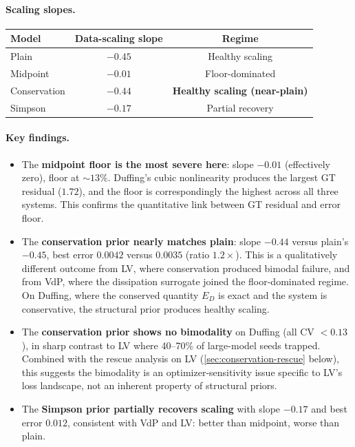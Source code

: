 \documentclass[11pt]{article}
\begin{document}
\paragraph{Scaling slopes.}

\begin{center}
\begin{tabular}{lcc}
\toprule
Model & Data-scaling slope & Regime \\
\midrule
Plain        & $-0.45$ & Healthy scaling \\
Midpoint     & $-0.01$ & Floor-dominated \\
Conservation & $-0.44$ & \textbf{Healthy scaling (near-plain)} \\
Simpson      & $-0.17$ & Partial recovery \\
\bottomrule
\end{tabular}
\end{center}

\paragraph{Key findings.}
\begin{itemize}[leftmargin=*]
    \item The \textbf{midpoint floor is the most severe here}: slope $-0.01$ (effectively zero), floor at $\sim\!13\%$.
    Duffing's cubic nonlinearity produces the largest GT residual ($1.72$), and the floor is correspondingly the highest across all three systems.
    This confirms the quantitative link between GT residual and error floor.
    \item The \textbf{conservation prior nearly matches plain}: slope $-0.44$ versus plain's $-0.45$, best error $0.0042$ versus $0.0035$ (ratio $1.2\times$).
    This is a qualitatively different outcome from LV, where conservation produced bimodal failure, and from VdP, where the dissipation surrogate joined the floor-dominated regime.
    On Duffing, where the conserved quantity $E_D$ is exact and the system is conservative, the structural prior produces healthy scaling.
    \item The \textbf{conservation prior shows no bimodality} on Duffing (all CV $< 0.13$), in sharp contrast to LV where 40--70\% of large-model seeds trapped.
    Combined with the rescue analysis on LV (\cref{sec:conservation-rescue} below), this suggests the bimodality is an optimizer-sensitivity issue specific to LV's loss landscape, not an inherent property of structural priors.
    \item The \textbf{Simpson prior partially recovers scaling} with slope $-0.17$ and best error $0.012$, consistent with VdP and LV: better than midpoint, worse than plain.
\end{itemize}
\end{document}
